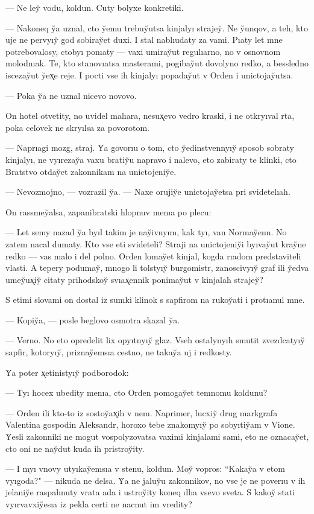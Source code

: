 \documentclass[10pt]{book}
\begin{document}
— Ne ley̆ vodu, koldun. Cuty bolyxe konkretiki.

— Nakoneq y̆a uznal, cto y̆emu trebuy̆utsa kinjalyı strajey̆. Ne y̆unqov, a teh, kto uje ne pervyıy̆ god sobiray̆et duxi. I stal nablıudaty za vami. Pıaty let mne potrebovalosy, ctobyı ponıaty — vaxi umiray̆ut regulıarno, no v osnovnom molodnıak. Te, kto stanovıatsa masterami, pogibay̆ut dovolyno redko, a bessledno iscezay̆ut y̆ex̨e reje. I pocti vse ih kinjalyı popaday̆ut v Orden i unictojay̆utsa.

— Poka y̆a ne uznal nicevo novovo.

On hotel otvetity, no uvidel malıara, nesux̨evo vedro kraski, i ne otkryıval rta, poka celovek ne skryılsa za povorotom.

— Naprıagi mozg, straj. Y̆a govorıu o tom, cto y̆edinstvennyıy̆ sposob sobraty kinjalyı, ne vyırezay̆a vaxu bratiy̆u napravo i nalevo, eto zabiraty te klinki, cto Bratstvo otday̆et zakonnikam na unictojeniy̆e.

— Nevozmojno, — vozrazil y̆a. — Naxe orujiy̆e unictojay̆etsa pri svidetelıah.

On rassmey̆alsa, zapanibratski hlopnuv menıa po plecu:

— Let semy nazad y̆a byıl takim je nay̆ivnyım, kak tyı, van Normay̆enn. No zatem nacal dumaty. Kto vse eti svideteli? Straji na unictojeniy̆i byıvay̆ut kray̆ne redko — vas malo i del polno. Orden lomay̆et kinjal, kogda rıadom predstaviteli vlasti. A tepery podumay̆, mnogo li tolstyıy̆ burgomistr, zanoscivyıy̆ graf ili y̆edva umey̆ux̨iy̆ citaty prihodskoy̆ svıax̨ennik ponimay̆ut v kinjalah strajey̆?

S etimi slovami on dostal iz sumki klinok s sapfirom na rukoy̆ati i protıanul mne.

— Kopiy̆a, — posle beglovo osmotra skazal y̆a.

— Verno. No eto opredelit lix opyıtnyıy̆ glaz. Vseh ostalynyıh smutit zvezdcatyıy̆ sapfir, kotoryıy̆, priznay̆emsıa cestno, ne takay̆a uj i redkosty.

Y̆a poter x̨etinistyıy̆ podborodok:

— Tyı hocex ubedity menıa, cto Orden pomogay̆et temnomu koldunu?

— Orden ili kto-to iz sostoy̆ax̨ih v nem. Naprimer, lucxiy̆ drug markgrafa Valentina gospodin Aleksandr, horoxo tebe znakomyıy̆ po sobyıtiy̆am v Vione. Y̆esli zakonniki ne mogut vospolyzovatsa vaximi kinjalami sami, eto ne oznacay̆et, cto oni ne nay̆dut kuda ih pristroy̆ity.

— I myı vnovy utyıkay̆emsıa v stenu, koldun. Moy̆ vopros: ``Kakay̆a v etom vyıgoda?" — nikuda ne delsa. Y̆a ne jaluy̆u zakonnikov, no vse je ne poverıu v ih jelaniy̆e raspahnuty vrata ada i ustroy̆ity koneq dlıa vsevo sveta. S kakoy̆ stati vyırvavxiy̆esıa iz pekla certi ne nacnut im vredity?
\end{document}
